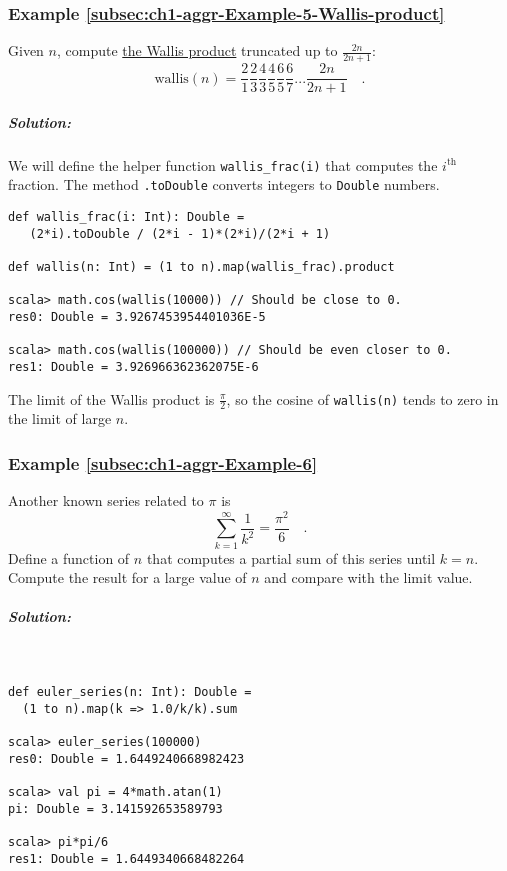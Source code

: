\subsubsection{Example \label{subsec:ch1-aggr-Example-5-Wallis-product}\ref{subsec:ch1-aggr-Example-5-Wallis-product}}

Given $n$, compute \href{https://en.wikipedia.org/wiki/Wallis_product}{the Wallis product}
truncated up to $\frac{2n}{2n+1}$: 
\[
\text{wallis}\left(n\right)=\frac{2}{1}\frac{2}{3}\frac{4}{3}\frac{4}{5}\frac{6}{5}\frac{6}{7}...\frac{2n}{2n+1}\quad.
\]


\subparagraph{Solution:}

We will define the helper function \lstinline!wallis_frac(i)! that
computes the $i^{\text{th}}$ fraction. The method \texttt{}\lstinline!.toDouble!
converts integers to \texttt{}\lstinline!Double! numbers.
\begin{lstlisting}
def wallis_frac(i: Int): Double =
   (2*i).toDouble / (2*i - 1)*(2*i)/(2*i + 1)

def wallis(n: Int) = (1 to n).map(wallis_frac).product

scala> math.cos(wallis(10000)) // Should be close to 0.
res0: Double = 3.9267453954401036E-5

scala> math.cos(wallis(100000)) // Should be even closer to 0.
res1: Double = 3.926966362362075E-6
\end{lstlisting}
The limit of the Wallis product is $\frac{\pi}{2}$, so the cosine
of \lstinline!wallis(n)! tends to zero in the limit of large $n$.

\subsubsection{Example \label{subsec:ch1-aggr-Example-6}\ref{subsec:ch1-aggr-Example-6}}

Another known series related to $\pi$ is
\[
\sum_{k=1}^{\infty}\frac{1}{k^{2}}=\frac{\pi^{2}}{6}\quad.
\]
Define a function of $n$ that computes a partial sum of this series
until $k=n$. Compute the result for a large value of $n$ and compare
with the limit value.

\subparagraph{Solution:}

~

\begin{lstlisting}
def euler_series(n: Int): Double = 
  (1 to n).map(k => 1.0/k/k).sum

scala> euler_series(100000)
res0: Double = 1.6449240668982423

scala> val pi = 4*math.atan(1)
pi: Double = 3.141592653589793

scala> pi*pi/6
res1: Double = 1.6449340668482264 
\end{lstlisting}


